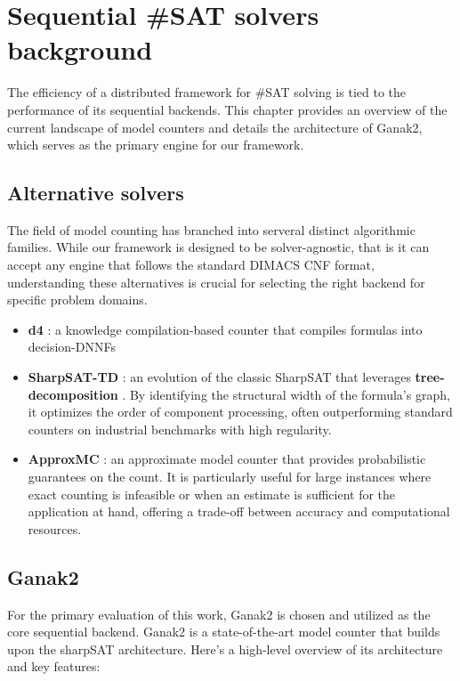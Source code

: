 \documentclass{report}
\begin{document}
\chapter{Sequential \#SAT solvers background}
The efficiency of a distributed framework for \#SAT solving is tied to 
the performance of its sequential backends. This chapter provides an overview 
of the current landscape of model counters and details the architecture of Ganak2, 
which serves as the primary engine for our framework.
\vspace{-1.5em}
\section{Alternative solvers}
\vspace{-1.5em}
The field of model counting has branched into serveral distinct algorithmic families.
While our framework is designed to be solver-agnostic, that is it can accept 
any engine that follows the standard DIMACS CNF \cite{sat-dimacs} format,
understanding these alternatives is crucial for selecting the right backend for specific problem domains.

\begin{itemize}
    \item \textbf{d4} : a knowledge compilation-based counter that compiles formulas into decision-DNNFs \cite{dnnf}
   \item \textbf{SharpSAT-TD} \cite{sharpSAT-TD} : an evolution of the classic SharpSAT \cite{sharpSAT} 
       that leverages \textbf{tree-decomposition} \cite{tree-decomp}. By identifying the structural width 
       of the formula's graph, it optimizes the order of component processing, often 
       outperforming standard counters on industrial benchmarks with high regularity.

    \item \textbf{ApproxMC} \cite{approxMC} : an approximate model counter that provides probabilistic guarantees on the count. 
    It is particularly useful for large instances where exact counting is infeasible or 
    when an estimate is sufficient for the application at hand, offering a trade-off between accuracy and computational resources.
\end{itemize}
\vspace{-1.5em}
\section{Ganak2}
\vspace{-1.5em}
For the primary evaluation of this work, Ganak2 \cite{SM2025, SRSM19} is chosen and utilized as the core sequential backend. 
Ganak2 is a state-of-the-art model counter that builds upon the sharpSAT architecture.
Here's a high-level overview of its architecture and key features:
\vspace{-1em}
\end{document}

